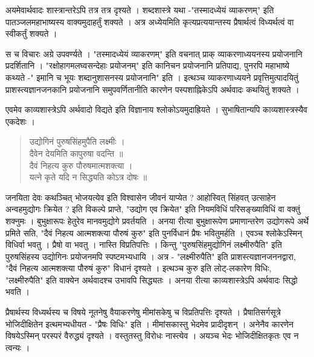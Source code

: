 {अयमेवार्थवादः शास्त्रान्तरेऽपि तत्र तत्र दृश्यते । शब्दशास्त्रे यथा  -"तस्मादध्येयं व्याकरणम्" इति पातञ्जलमहाभाष्यस्य वाक्यमुदाहर्तुं शक्यते  । अत्र अध्येयमिति कृत्यप्रत्ययान्तस्य प्रैषार्थत्वं विध्यर्थत्वं वा स्वीकर्तुं शक्यते ।

स च विचारः अग्रे उपवर्ण्यते । "तस्मादध्येयं व्याकरणम्" इति वचनात् प्राक् व्याकरणाध्ययनस्य प्रयोजनानि प्रदर्शितानि । "रक्षोहागमलघ्वसन्देहाः प्रयोजनम्" इति कानिचन प्रयोजनानि प्रतिपाद्य, पुनरपि महाभाष्ये कथ्यते -" इमानि च भूयः शब्दानुशासनस्य प्रयोजनानि" इति । इत्थञ्च व्याकरणाध्ययने प्रवृत्तिमुत्पादयितुं प्राशस्त्यज्ञानजनकानि प्रयोजनानि समुपवर्णितानीति कारणेन पस्पशाह्निकेऽपि अर्थवादः कथयितुं शक्यते ।

एवमेव काव्यशास्त्रेऽपि अर्थवादो विद्यते इति विज्ञानाय श्लोकोऽयमुदाह्रियते । सुभाषितान्यपि काव्यशास्त्रस्यैव एकदेशः । 
\begin{verse}
उद्योगिनं पुरुषसिंहमुपैति लक्ष्मीः ।\\
दैवेन देयमिति कापुरुषा वदन्ति ॥\\
दैवं निहत्य कुरु पौरुषमात्मशक्त्या ।\\
यत्ने कृते यदि न सिद्ध्यति कोऽत्र दोषः ॥
\end{verse}
जनयिता देवः कथञ्चित् भोजयत्येव इति विश्वासेन जीवनं याप्येत ? आहोस्वित्  सिंहवत् उत्साहेन अन्वहमुद्योगः क्रियेत ? इति विकल्पे प्राप्ते, "उद्योग एव क्रियेत" इति नियमविधिं परिसङ्ख्याविधिं वा वक्तुं शक्नुमः । बुभुक्षारूपः हेतुरेव मानवमुद्योगे प्रवर्तयति । अनया रीत्या बुभुक्षारूपेण प्रमाणान्तरेण उद्योगरूपे अर्थे प्रमिते सति, "दैवं निहत्य आत्मशक्त्या पौरुषं कुरु" इति पुनर्विधानं प्रैषः भवितुमर्हति । एवञ्च श्लोकेऽस्मिन् विधिर्वा भवतु । प्रैषो वा भवतु । नास्ति विप्रतिपत्तिः । किन्तु "पुरुषसिंहमुद्योगिनं लक्ष्मीरुपैति" इति पुरुषसिंहस्य उद्योगिनः प्रयोजनमपि स्पष्टमभ्यधायि । अत्र - "लक्ष्मीरुपैति" इति प्राशस्त्यज्ञानजननद्वारा, "दैवं निहत्य आत्मशक्त्या पौरुषं कुरु" विधानं दृश्यते । इत्थञ्च कुरु इति लोट्-लकारेण विधिः, "लक्ष्मीरुपैति" इति वाक्येन अर्थवादश्च उभावपि सिद्ध्यतः । अनया रीत्या काव्यशास्त्रेऽपि अर्थवादः सिद्धो भवति ।

प्रैषार्थस्य विध्यर्थस्य च विषये नूतनेषु वैयाकरणेषु मीमांसकेषु च विप्रतिपत्तिः दृश्यते । प्रैषातिसर्गसूत्रे भोजिदीक्षितेन इत्थमभ्यधीयत - "प्रैषः विधिः" इति । मीमांसकास्तु भेदमेव प्रादीदृशन् । अनेनैव कारणेन विषयेऽस्मिन् परस्परं वैरुद्ध्यं दृश्यते । वस्तुतस्तु विरोधः नास्त्येव । अयञ्च भेदः भोजिदीक्षितकृतः एव न त्वन्यः ।

}

